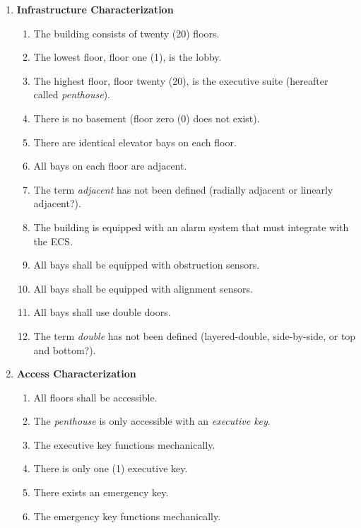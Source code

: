 \documentclass[12pt]{article}
\begin{document}
\begin{enumerate}



\item{\textbf{Infrastructure Characterization}
\begin{enumerate}
\item The building consists of twenty (20) floors.
\item The lowest floor, floor one (1), is the lobby.
\item The highest floor, floor twenty (20), is the executive suite (hereafter called \textit{penthouse}).
\item There is no basement (floor zero (0) does not exist).
\item There are identical elevator bays on each floor.
\item All bays on each floor are adjacent.
\item The term \textit{adjacent} has not been defined (radially adjacent or linearly adjacent?).
\item The building is equipped with an alarm system that must integrate with the ECS.
\item All bays shall be equipped with obstruction sensors.
\item All bays shall be equipped with alignment sensors.
\item All bays shall use double doors.
\item The term \textit{double} has not been defined (layered-double, side-by-side, or top and bottom?).
\end{enumerate}}

\item{\textbf{Access Characterization}
\begin{enumerate}
\item All floors shall be accessible.
\item The \textit{penthouse} is only accessible with an \textit{executive key}.
\item The executive key functions mechanically.
\item There is only one (1) executive key.
\item There exists an emergency key.
\item The emergency key functions mechanically.
\end{enumerate}}
\end{enumerate}
\end{document}
